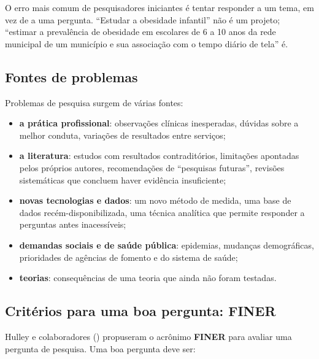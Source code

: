 \documentclass[
]{book}
\providecommand{\tightlist}{%
  \setlength{\itemsep}{0pt}\setlength{\parskip}{0pt}}
\begin{document}
O erro mais comum de pesquisadores iniciantes é tentar responder a um tema, em vez de a uma pergunta. ``Estudar a obesidade infantil'' não é um projeto; ``estimar a prevalência de obesidade em escolares de 6 a 10 anos da rede municipal de um município e sua associação com o tempo diário de tela'' é.

\subsection{Fontes de problemas}\label{fontes-de-problemas}

Problemas de pesquisa surgem de várias fontes:

\begin{itemize}
\tightlist
\item
  \textbf{a prática profissional}: observações clínicas inesperadas, dúvidas sobre a melhor conduta, variações de resultados entre serviços;
\item
  \textbf{a literatura}: estudos com resultados contraditórios, limitações apontadas pelos próprios autores, recomendações de ``pesquisas futuras'', revisões sistemáticas que concluem haver evidência insuficiente;
\item
  \textbf{novas tecnologias e dados}: um novo método de medida, uma base de dados recém-disponibilizada, uma técnica analítica que permite responder a perguntas antes inacessíveis;
\item
  \textbf{demandas sociais e de saúde pública}: epidemias, mudanças demográficas, prioridades de agências de fomento e do sistema de saúde;
\item
  \textbf{teorias}: consequências de uma teoria que ainda não foram testadas.
\end{itemize}

\subsection{Critérios para uma boa pergunta: FINER}\label{crituxe9rios-para-uma-boa-pergunta-finer}

Hulley e colaboradores () propuseram o acrônimo \textbf{FINER} para avaliar uma pergunta de pesquisa. Uma boa pergunta deve ser:
\end{document}
